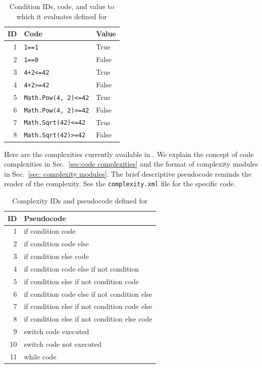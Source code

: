 \begin{appendices}
\begin{table}[H]
\centering
\caption{Condition IDs, code, and value to which it evaluates defined for
  \CSharp}
\begin{tabular}{|r|l|l|}
\hline
\textbf{ID} & \textbf{Code} & \textbf{Value} \\
\hline
1 & \verb|1==1| & True \\
\hline
2 & \verb|1==0| & False \\
\hline
3 & \verb|4+2<=42| & True \\
\hline
4 & \verb|4+2>=42| & False \\
\hline
5 & \verb|Math.Pow(4, 2)<=42| & True \\
\hline
6 & \verb|Math.Pow(4, 2)>=42| & False \\
\hline
7 & \verb|Math.Sqrt(42)<=42| & True \\
\hline
8 & \verb|Math.Sqrt(42)>=42| & False \\
\hline
\end{tabular}
\label{tab:condition IDs for CSharp}
\end{table}


\newpage

Here are the complexities currently available in \CSharp.
We explain the concept of code complexities in Sec.~\ref{sec:code complexities} and
the format of complexity modules in Sec.~\ref{sec: complexity modules}.
The brief descriptive pseudocode reminds the reader of the complexity.
See the \verb|complexity.xml| file for the specific code.

\begin{table}[H]
\centering
\caption{Complexity IDs and pseudocode defined for \CSharp}
\begin{tabular}{|r|l|}
\hline
\textbf{ID} & \textbf{Pseudocode} \\
\hline
 1 & if condition code \\
\hline
 2 & if condition code else \\
\hline
 3 & if condition else code \\
\hline
 4 & if condition code else if not condition \\
\hline
 5 & if condition else if not condition code \\
\hline
 6 & if condition code else if not condition else \\
\hline
 7 & if condition else if not condition code else \\
 \hline
 8 & if condition else if not condition else code \\
\hline
 9 & switch code executed \\
\hline
10 & switch code not executed \\
\hline
11 & while code \\
\hline


\end{tabular}
\end{table}
\end{appendices}
